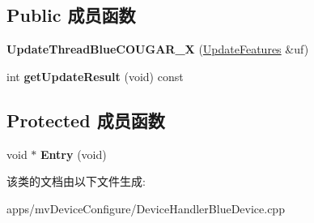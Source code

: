 \subsection*{Public 成员函数}
\begin{DoxyCompactItemize}
\item 
\hypertarget{class_update_thread_blue_c_o_u_g_a_r___x_ac0afbb94ca74a1079703084ab5b04c4d}{{\bfseries Update\+Thread\+Blue\+C\+O\+U\+G\+A\+R\+\_\+\+X} (\hyperlink{struct_update_features}{Update\+Features} \&uf)}\label{class_update_thread_blue_c_o_u_g_a_r___x_ac0afbb94ca74a1079703084ab5b04c4d}

\item 
\hypertarget{class_update_thread_blue_c_o_u_g_a_r___x_a8e66b8109b52cea1a36603a5c824f638}{int {\bfseries get\+Update\+Result} (void) const }\label{class_update_thread_blue_c_o_u_g_a_r___x_a8e66b8109b52cea1a36603a5c824f638}

\end{DoxyCompactItemize}
\subsection*{Protected 成员函数}
\begin{DoxyCompactItemize}
\item 
\hypertarget{class_update_thread_blue_c_o_u_g_a_r___x_a178ff40d798d4d0b2f6cbc956b39dc16}{void $\ast$ {\bfseries Entry} (void)}\label{class_update_thread_blue_c_o_u_g_a_r___x_a178ff40d798d4d0b2f6cbc956b39dc16}

\end{DoxyCompactItemize}


该类的文档由以下文件生成\+:\begin{DoxyCompactItemize}
\item 
apps/mv\+Device\+Configure/Device\+Handler\+Blue\+Device.\+cpp\end{DoxyCompactItemize}
